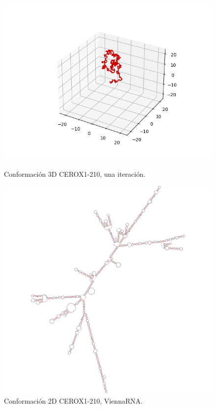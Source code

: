 \documentclass[a4paper,11pt,titlepage]{article}
\theoremstyle{definition}
\begin{document}
\begin{figure}[H]
    \centering
    \begin{minipage}[c]{0.45\textwidth}
        \centering
        \includegraphics[width=\textwidth]{images/CEROX1-210-db_one.png}
        \caption{Conformación 3D CEROX1-210, una iteración.}
        \label{fig:CEROX1-210-one}
    \end{minipage}
    \hfill
    \begin{minipage}[c]{0.45\textwidth}
        \centering
        \includegraphics[width=\textwidth]{images/CEROX1-210-db_vrna.png}
        \caption{Conformación 2D CEROX1-210, ViennaRNA.}
        \label{fig:CEROX1-210-vrna}
    \end{minipage}
\end{figure}
\end{document}
